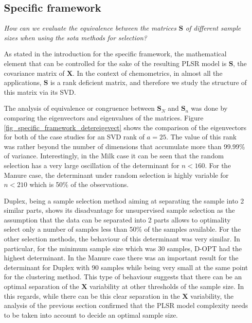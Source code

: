 \documentclass[journal=ancham,manuscript=article]{achemso}
\begin{document}
\subsection*{Specific framework}\label{results:specframework}

\emph{How can we evaluate the equivalence between the matrices $\mathbf{S}$ of different sample sizes when using the sota methods for selection?}

As stated in the introduction for the specific framework, the mathematical element that can be controlled for the sake of the resulting PLSR model is $\mathbf{S}$, the covariance matrix of $\mathbf{X}$. In the context of chemometrics, in almost all the applications, $\mathbf{S}$ is a rank deficient matrix, and therefore we study the structure of this matrix via its SVD. 

The analysis of equivalence or congruence between $\mathbf{S}_N$ and $\mathbf{S}_n$ was done by comparing the eigenvectors and eigenvalues of the matrices. Figure \ref{fig_specific_framework_detereigevect} shows the comparison of the eigenvectors for both of the case studies for an SVD rank of $a=25$. The value of this rank was rather beyond the number of dimensions that accumulate more than 99.99\% of variance. Interestingly, in the Milk case it can be seen that the random selection has a very large oscillation of the determinant for $n<160$. For the Manure case, the determinant under random selection is highly variable for $n<210$ which is 50\% of the observations. 

Duplex, being a sample selection method aiming at separating the sample into 2 similar parts, shows its disadvantage for unsupervised sample selection as the assumption that the data can be separated into 2 parts allows to optimality select only a number of samples less than 50\% of the samples available. For the other selection methods, the behaviour of this determinant was very similar. In particular, for the minimum sample size which was 30 samples, D-OPT had the highest determinant. In the Manure case there was an important result for the determinant for Duplex with 90 samples while being very small at the same point for the clustering method. This type of behaviour suggests that there can be an optimal separation of the $\mathbf{X}$ variability at other thresholds of the sample size. In this regards, while there can be this clear separation in the $\mathbf{X}$ variability, the analysis of the previous section confirmed that the PLSR model complexity needs to be taken into account to decide an optimal sample size. 
\end{document}
